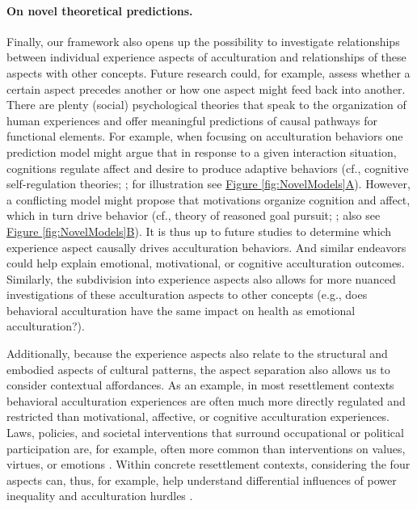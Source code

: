 \documentclass[man, 12pt, a4paper, mask]{apa7}
\newcommand{\fgrref}[2][]{\hyperref[#2]{Figure \ref*{#2}#1}}
\begin{document}
\paragraph{On novel theoretical predictions.} Finally, our framework also opens up the possibility to investigate relationships between individual experience aspects of acculturation and relationships of these aspects with other concepts. Future research could, for example, assess whether a certain aspect precedes another or how one aspect might feed back into another. There are plenty (social) psychological theories that speak to the organization of human experiences and offer meaningful predictions of causal pathways for functional elements. For example, when focusing on acculturation behaviors one prediction model might argue that in response to a given interaction situation, cognitions regulate affect and desire to produce adaptive behaviors (cf., cognitive self-regulation theories; \citealp{Panadero2017}; for illustration see \fgrref[A]{fig:NovelModels}). However, a conflicting model might propose that motivations organize cognition and affect, which in turn drive behavior (cf., theory of reasoned goal pursuit; \citealp{Ajzen2019}; also see \fgrref[B]{fig:NovelModels}). It is thus up to future studies to determine which experience aspect causally drives acculturation behaviors. And similar endeavors could help explain emotional, motivational, or cognitive acculturation outcomes. Similarly, the subdivision into experience aspects also allows for more nuanced investigations of these acculturation aspects to other concepts (e.g., does behavioral acculturation have the same impact on health as emotional acculturation?). 

Additionally, because the experience aspects also relate to the structural and embodied aspects of cultural patterns, the aspect separation also allows us to consider contextual affordances. As an example, in most resettlement contexts behavioral acculturation experiences are often much more directly regulated and restricted than motivational, affective, or cognitive acculturation experiences. Laws, policies, and societal interventions that surround occupational or political participation are, for example, often more common than interventions on values, virtues, or emotions \citep[][]{shafir2013}. Within concrete resettlement contexts, considering the four aspects can, thus, for example, help understand differential influences of power inequality and acculturation hurdles \citep[][]{Bhatia2001, Khawaja2019}. 
\end{document}
